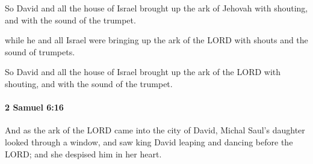 			\begin{versebox}
					\item[BHS] 
					\item[ASV] So David and all the house of Israel brought up the ark of Jehovah with shouting, and with the sound of the trumpet.
					\item[NIV] while he and all Israel were bringing up the ark of the LORD with shouts and the sound of trumpets.
					\item[NRSV] So David and all the house of Israel brought up the ark of the LORD with shouting, and with the sound of the trumpet.
			\end{versebox}

		\paragraph{2 Samuel 6:16} %
			\label{2SAMUEL-6-16}

			And as the ark of the LORD came into the city of David, Michal Saul’s daughter looked through a window, and saw king David leaping and dancing before the LORD; and she despised him in her heart.

